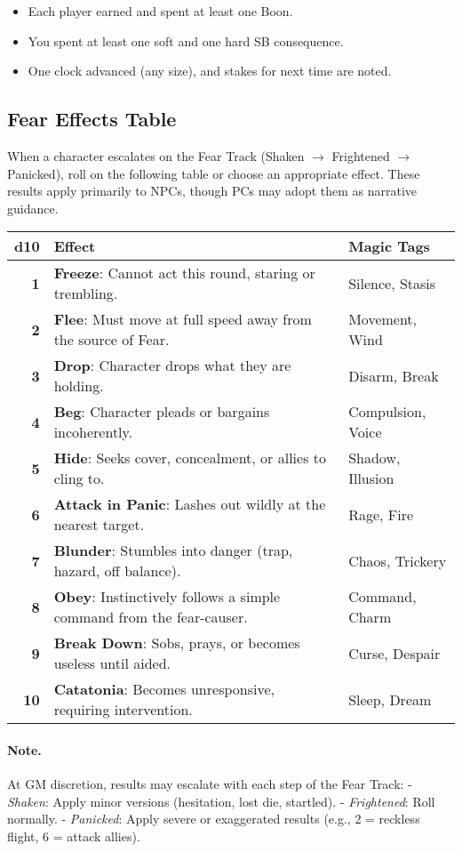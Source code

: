 \begin{tcolorbox}[title={Session 1 Done When},colback=gray!5,colframe=black]
\begin{itemize}
  \item Each player earned and spent at least one Boon.
  \item You spent at least one soft and one hard SB consequence.
  \item One clock advanced (any size), and stakes for next time are noted.
\end{itemize}
\end{tcolorbox}

\subsection{Fear Effects Table}
\label{subsec:fear-table}

When a character escalates on the Fear Track (Shaken $\rightarrow$ Frightened $\rightarrow$ Panicked), roll on the following table or choose an appropriate effect. These results apply primarily to NPCs, though PCs may adopt them as narrative guidance.

\begin{center}
\begin{tabular}{>{\bfseries}r l l}
\toprule
d10 & Effect & Magic Tags \\
\midrule
1 & \textbf{Freeze}: Cannot act this round, staring or trembling. & Silence, Stasis \\
2 & \textbf{Flee}: Must move at full speed away from the source of Fear. & Movement, Wind \\
3 & \textbf{Drop}: Character drops what they are holding. & Disarm, Break \\
4 & \textbf{Beg}: Character pleads or bargains incoherently. & Compulsion, Voice \\
5 & \textbf{Hide}: Seeks cover, concealment, or allies to cling to. & Shadow, Illusion \\
6 & \textbf{Attack in Panic}: Lashes out wildly at the nearest target. & Rage, Fire \\
7 & \textbf{Blunder}: Stumbles into danger (trap, hazard, off balance). & Chaos, Trickery \\
8 & \textbf{Obey}: Instinctively follows a simple command from the fear-causer. & Command, Charm \\
9 & \textbf{Break Down}: Sobs, prays, or becomes useless until aided. & Curse, Despair \\
10 & \textbf{Catatonia}: Becomes unresponsive, requiring intervention. & Sleep, Dream \\
\bottomrule
\end{tabular}
\end{center}

\paragraph{Note.}  
At GM discretion, results may escalate with each step of the Fear Track:  
- \emph{Shaken}: Apply minor versions (hesitation, lost die, startled).  
- \emph{Frightened}: Roll normally.  
- \emph{Panicked}: Apply severe or exaggerated results (e.g., 2 = reckless flight, 6 = attack allies).  